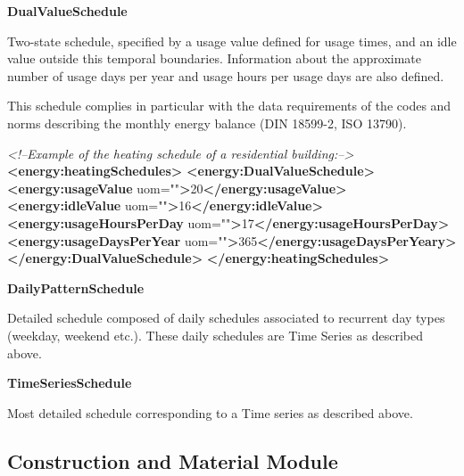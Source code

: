 \documentclass[a4paper,12pt]{article}
\newenvironment{Shaded}{}{}
\newcommand{\KeywordTok}[1]{\textcolor[rgb]{0.00,0.44,0.13}{\textbf{{#1}}}}
\newcommand{\StringTok}[1]{\textcolor[rgb]{0.25,0.44,0.63}{{#1}}}
\newcommand{\CommentTok}[1]{\textcolor[rgb]{0.38,0.63,0.69}{\textit{{#1}}}}
\newcommand{\OtherTok}[1]{\textcolor[rgb]{0.00,0.44,0.13}{{#1}}}
\newcommand{\NormalTok}[1]{{#1}}
\begin{document}
\textbf{DualValueSchedule}

Two-state schedule, specified by a usage value defined for usage times,
and an idle value outside this temporal boundaries. Information about
the approximate number of usage days per year and usage hours per usage
days are also defined.

This schedule complies in particular with the data requirements of the
codes and norms describing the monthly energy balance (DIN 18599-2, ISO
13790).

\begin{Shaded}
\begin{Highlighting}[]
\CommentTok{<!--Example of the heating schedule of a residential building:-->}
\KeywordTok{<energy:heatingSchedules>}
    \KeywordTok{<energy:DualValueSchedule>}
        \KeywordTok{<energy:usageValue}\OtherTok{ uom=}\StringTok{""}\KeywordTok{>}\NormalTok{20}\KeywordTok{</energy:usageValue>}
        \KeywordTok{<energy:idleValue}\OtherTok{ uom=}\StringTok{""}\KeywordTok{>}\NormalTok{16}\KeywordTok{</energy:idleValue>}
        \KeywordTok{<energy:usageHoursPerDay}\OtherTok{ uom=}\StringTok{""}\KeywordTok{>}\NormalTok{17}\KeywordTok{</energy:usageHoursPerDay>}
        \KeywordTok{<energy:usageDaysPerYear}\OtherTok{ uom=}\StringTok{""}\KeywordTok{>}\NormalTok{365}\KeywordTok{</energy:usageDaysPerYeary>}
    \KeywordTok{</energy:DualValueSchedule>}
\KeywordTok{</energy:heatingSchedules>}
\end{Highlighting}
\end{Shaded}

\textbf{DailyPatternSchedule}

Detailed schedule composed of daily schedules associated to recurrent
day types (weekday, weekend etc.). These daily schedules are Time Series
as described above.

\textbf{TimeSeriesSchedule}

Most detailed schedule corresponding to a Time series as described
above.

\subsection{Construction and Material
Module}\label{construction-and-material-module}
\end{document}
